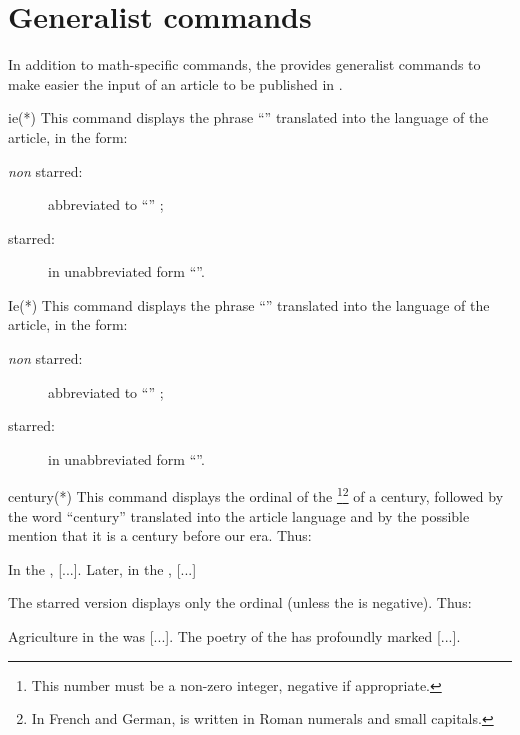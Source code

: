 \documentclass[english,nolocaltoc]{nwejmart}
\newtheorem[style=definition]{fact}
\newtheorem[title-plural=Criteria]{criterion}
\newtheorem[title=random experiment]{rexp}
\begin{document}
\section{Generalist commands}
\label{sec:comm-gener}

In addition to math-specific commands, the \nwejmauthorcl{} provides
generalist commands to make easier the input of an article to be
published in  \nwejm{}.


\begin{docCommand}{ie(*)}{}
  This command displays the phrase  \enquote{\ie*{}} translated into
  the language of the article, in the form:
  \begin{description}
  \item[\emph{non} starred:] abbreviated to \enquote{\ie{}} ;
  \item[starred:] in unabbreviated form \enquote{\ie*{}}.
  \end{description}
\end{docCommand}

\begin{docCommand}{Ie(*)}{}
  This command displays the phrase \enquote{\Ie*{}} translated into
  the language of the article, in the form: 
  \begin{description}
     \item[\emph{non} starred:] abbreviated to \enquote{\Ie{}} ;
  \item[starred:] in unabbreviated form \enquote{\Ie*{}}.
  \end{description}
\end{docCommand}

\begin{docCommand}{century(*)}{}
  This command displays the ordinal of the \footnote{This
    number must be a non-zero integer, negative if
    appropriate.}\footnote{In French and German,   is
    written in Roman numerals and small capitals.} of a century,
  followed by the word  \enquote{century} translated into the article language
  and  by the possible mention that it is a century before our era. Thus:
\begin{bodycode}
In the , [...]. Later, in the , [...]
\end{bodycode}
  The starred version displays only the ordinal (unless the   is
  negative). Thus:
\begin{bodycode}
Agriculture in the  was [...].
The poetry of the  has profoundly marked [...].
\end{bodycode}
\end{docCommand}
\end{document}
